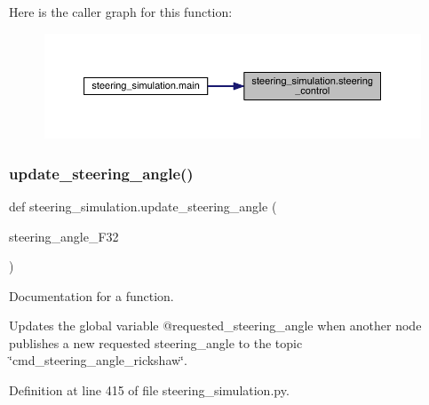 Here is the caller graph for this function\+:\nopagebreak
\begin{figure}[H]
\begin{center}
\leavevmode
\includegraphics[width=350pt]{namespacesteering__simulation_a7e6cf517d5eedfae29bc0b05bada6a3e_icgraph}
\end{center}
\end{figure}
\mbox{\label{namespacesteering__simulation_ade71f08294031e29a94a9be5cc1f0961}} 
\subsubsection{\texorpdfstring{update\_steering\_angle()}{update\_steering\_angle()}}
{\footnotesize\ttfamily def steering\+\_\+simulation.\+update\+\_\+steering\+\_\+angle (\begin{DoxyParamCaption}\item[{}]{steering\+\_\+angle\+\_\+\+F32 }\end{DoxyParamCaption})}



Documentation for a function. 

Updates the global variable @requested\+\_\+steering\+\_\+angle when another node publishes a new requested steering\+\_\+angle to the topic \char`\"{}cmd\+\_\+steering\+\_\+angle\+\_\+rickshaw\char`\"{}. 

Definition at line 415 of file steering\+\_\+simulation.\+py.


\begin{DoxyCode}{0}

\end{DoxyCode}


